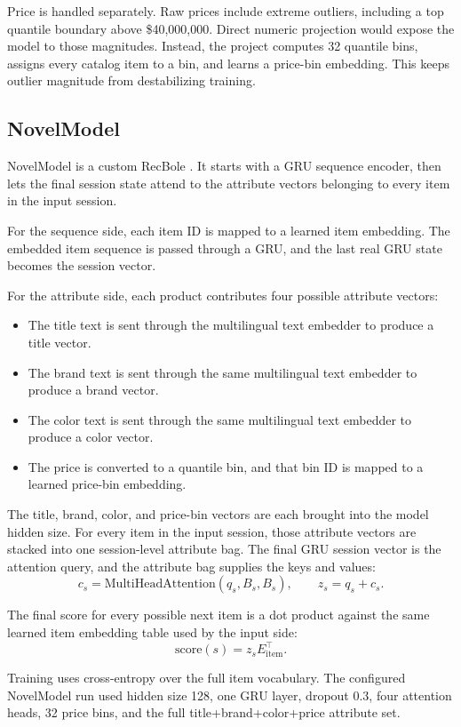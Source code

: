 \documentclass[11pt]{article}
\newcommand{\code}[1]{\texttt{\detokenize{#1}}}
\begin{document}
Price is handled separately. Raw prices include extreme outliers, including a top quantile boundary above \$40,000,000. Direct numeric projection would expose the model to those magnitudes. Instead, the project computes 32 quantile bins, assigns every catalog item to a bin, and learns a price-bin embedding. This keeps outlier magnitude from destabilizing training.

\subsection{NovelModel}

NovelModel is a custom RecBole \code{SequentialRecommender}. It starts with a GRU sequence encoder, then lets the final session state attend to the attribute vectors belonging to every item in the input session.

For the sequence side, each item ID is mapped to a learned item embedding. The embedded item sequence is passed through a GRU, and the last real GRU state becomes the session vector.

For the attribute side, each product contributes four possible attribute vectors:
\begin{itemize}
  \item The title text is sent through the multilingual text embedder to produce a title vector.
  \item The brand text is sent through the same multilingual text embedder to produce a brand vector.
  \item The color text is sent through the same multilingual text embedder to produce a color vector.
  \item The price is converted to a quantile bin, and that bin ID is mapped to a learned price-bin embedding.
\end{itemize}

The title, brand, color, and price-bin vectors are each brought into the model hidden size. For every item in the input session, those attribute vectors are stacked into one session-level attribute bag. The final GRU session vector is the attention query, and the attribute bag supplies the keys and values:
\[
  c_s = \mathrm{MultiHeadAttention}(q_s, B_s, B_s), \qquad
  z_s = q_s + c_s.
\]

The final score for every possible next item is a dot product against the same learned item embedding table used by the input side:
\[
  \mathrm{score}(s) = z_s E_{\mathrm{item}}^\top.
\]

Training uses cross-entropy over the full item vocabulary. The configured NovelModel run used hidden size 128, one GRU layer, dropout 0.3, four attention heads, 32 price bins, and the full title+brand+color+price attribute set.
\end{document}

